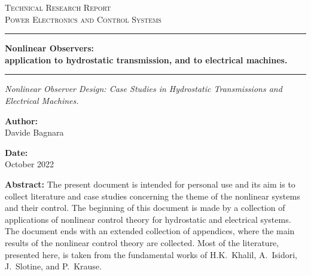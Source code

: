 \documentclass[12pt,a4paper,oneside]{book}
\newcommand{\DocCategory}{Technical Research Report}
\newcommand{\DocField}{Power Electronics and Control Systems}
\newcommand{\DocTitle}{%
	{\fontsize{20}{24}\selectfont\bfseries Nonlinear Observers:} \\[16pt]
	{\fontsize{16}{20}\selectfont\bfseries application to hydrostatic transmission, and to electrical machines.}
}
\newcommand{\DocSubtitle}{%
	Nonlinear Observer Design: Case Studies in Hydrostatic Transmissions and Electrical Machines. 
}
\newcommand{\DocAuthor}{Davide Bagnara}
\newcommand{\DocDate}{October 2022}
\newcommand{\DocAbstract}{%
	The present document is intended for personal use and its aim is to collect literature and case studies concerning the theme of the nonlinear systems and their control. The beginning of this document is made by a collection of applications of nonlinear control theory for hydrostatic and electrical systems. The document ends with an extended collection of appendices, where the main results of the nonlinear control theory are collected. Most of the literature, presented here, is taken from the fundamental works of H.K.~Khalil, A.~Isidori, J.~Slotine, and P.~Krause. 
}
\begin{document}
	\titlepage
	\begin{center}
		{\Large\scshape \DocCategory}\\[8pt]
		{\large\scshape \DocField}
	\end{center}
	
	\vspace{36pt}
	\noindent\rule{\linewidth}{0.8pt}
	
	\begin{center}
		\DocTitle
	\end{center}
	
	\vspace{4pt}
	\noindent\rule{\linewidth}{2.2pt}
	
	\begin{center}
		\begin{onehalfspace}
			{\large\itshape \DocSubtitle}
		\end{onehalfspace}
	\end{center}
	
	\vspace{36pt}
	
	\begin{minipage}{0.92\linewidth}
		\noindent
		\begin{minipage}[t]{0.48\linewidth}
			\textbf{Author:}\\[2pt]
			\DocAuthor
		\end{minipage}%
		\hfill
		\begin{minipage}[t]{0.48\linewidth}
			\raggedleft
			\textbf{Date:}\\[2pt]
			\DocDate
		\end{minipage}
	\end{minipage}
	\vspace{36pt}
	
	\begin{center}
		\begin{minipage}{0.85\linewidth}
			\footnotesize 
			\begin{onehalfspace}
				\textbf{Abstract:} \DocAbstract
			\end{onehalfspace}
		\end{minipage}
	\end{center}
	
\end{document}
